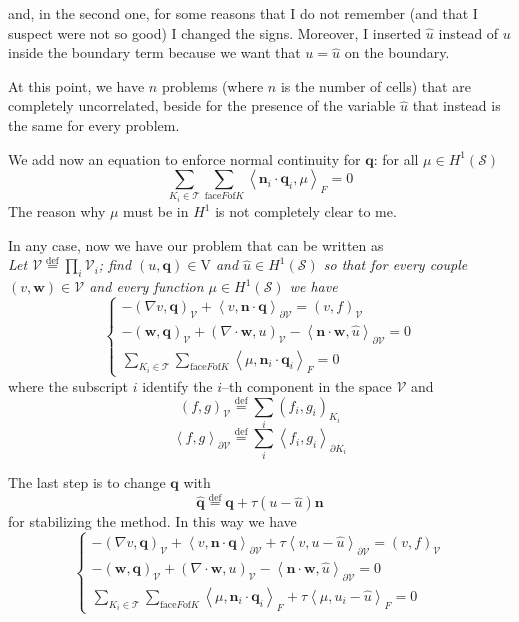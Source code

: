 \documentclass[a4paper,12pt, draft]{article}
\newcommand{\Def}{\stackrel{\mathrm{def}}{=}}
\newcommand{\diver}[1]{\ensuremath{\nabla \cdot #1}}
\newcommand{\uu}{u}
\newcommand{\q}{\mathbf{q}}
\newcommand{\skeleton}{\mathcal{S}}
\newcommand{\triangulation}{\mathcal{T}}
\begin{document}
and, in the second one, for some reasons that I do not remember (and that I suspect were not so
good) I changed the signs. Moreover, I inserted $\hat{\uu}$ instead of $\uu$ inside the boundary
term because we want that $\uu = \hat{\uu}$ on the boundary.

At this point, we have $n$ problems (where $n$ is the number of cells) that are completely
uncorrelated, beside for the presence of the variable $\hat{\uu}$ that instead is the same for every
problem.

We add now an equation to enforce normal continuity for $\q$: for all $\mu \in H^1(\skeleton)$
\[  \sum_{K_i \in \triangulation} \sum_{\mathrm{face } F \mathrm{ of } K} \left<
\mathbf{n}_i \cdot \q_i, \mu\right>_{F} = 0 \]
The reason why $\mu$ must be in $H^1$ is not completely clear to me.

In any case, now we have our problem that can be written as \\
{\it Let $\mathcal{V} \Def \prod_{i} \mathcal{V}_i$; find $(\uu, \q) \in \mathrm{V}$ and
$\hat{\uu} \in H^1(\skeleton)$ so that for every couple $(v, \mathbf{w}) \in \mathcal{V}$ and
every function $\mu \in H^1(\skeleton)$ we have}
\[
    \begin{cases}
      -\left(\nabla v, \q\right)_{\mathcal{V}} + \left<v, \mathbf{n} \cdot
          \q\right>_{\partial \mathcal{V}} = \left(v, f\right)_{\mathcal{V}} \\
      -\left(\mathbf{w}, \q\right)_{\mathcal{V}} \! + \left(\diver{\mathbf{w}},\uu
          \right)_{\mathcal{V}} \! -  \left<\mathbf{n} \cdot \mathbf{w}, \hat{\uu}
          \right>_{\partial \mathcal{V}} = 0 \\
     \displaystyle \sum_{K_i \in \triangulation} \sum_{\mathrm{face } F \mathrm{ of } K} \left< \mu,
          \mathbf{n}_i \cdot \q_i\right>_{F} = 0
    \end{cases}
\]
where the subscript $i$ identify the $i$--th component in the space $\mathcal{V}$ and
\[ \left( f, g \right)_{\mathcal{V}} \Def \sum_{i} \left(f_{i}, g_{i}\right)_{K_i}\]
\[ \left< f, g \right>_{\partial\mathcal{V}} \Def \sum_{i} \left<f_i, g_i \right>_{\partial K_i} \]

The last step is to change $\q$ with
\[\hat{\q} \Def \q + \tau \left(\uu - \hat{\uu} \right)\mathbf{n} \]
for stabilizing the method. In this way we have
\[
     \begin{cases}
      -\left(\nabla v, \q\right)_{\mathcal{V}} + \left<v, \mathbf{n} \cdot
          \q\right>_{\partial \mathcal{V}} +\tau \left<v, \uu - \hat{\uu} \right>_{\partial
\mathcal{V}}  = \left(v, f\right)_{\mathcal{V}} \\
      -\left(\mathbf{w}, \q\right)_{\mathcal{V}} \! + \left(\diver{\mathbf{w}},\uu
          \right)_{\mathcal{V}} \! -  \left<\mathbf{n} \cdot \mathbf{w}, \hat{\uu}
          \right>_{\partial \mathcal{V}} = 0 \\
     \displaystyle \sum_{K_i \in \triangulation} \sum_{\mathrm{face } F \mathrm{ of } K} \left<
          \mu, \mathbf{n}_i \cdot \q_i\right>_{F} +\tau \left<\mu, \uu_i - \hat{\uu} \right>_{F}
= 0
    \end{cases}
\]
\end{document}
